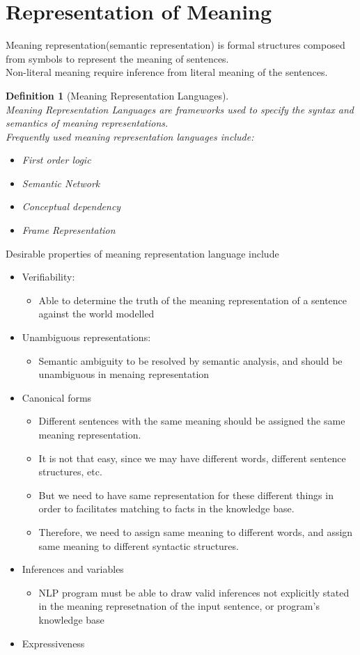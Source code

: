 \documentclass[12pt]{article}
\newtheorem{definition}{Definition}[section]
\theoremstyle{definition}
\begin{document}
\section{Representation of Meaning}
Meaning representation(semantic representation) is formal structures composed from symbols to represent the meaning of sentences.\\
Non-literal meaning require inference from literal meaning of the sentences.\\
\begin{definition}[Meaning Representation Languages]
\hfill\\\normalfont Meaning Representation Languages are frameworks used to specify the syntax and semantics of meaning representations. \\
Frequently used meaning representation languages include:
\begin{itemize}
	\item First order logic
	\item Semantic Network
	\item Conceptual dependency
	\item Frame Representation
\end{itemize}
\end{definition}
Desirable properties of meaning representation language include
\begin{itemize}
	\item Verifiability: 
	\begin{itemize}
		\item Able to determine the truth of the meaning representation of a sentence against the world modelled
	\end{itemize}
	\item Unambiguous representations:
	\begin{itemize}
		\item Semantic ambiguity to be resolved by semantic analysis, and should be unambiguous in menaing representation
	\end{itemize}
	\item Canonical forms
	\begin{itemize}
		\item Different sentences with the same meaning should be assigned the same meaning representation.
		\item It is not that easy, since we may have different words, different sentence structures, etc.
		\item But we need to have same representation for these different things in order to facilitates matching to facts in the knowledge base.
		\item Therefore, we need to assign same meaning to different words, and assign same meaning to different syntactic structures.
	\end{itemize}
	\item Inferences and variables
	\begin{itemize}
		\item NLP program must be able to draw valid inferences not explicitly stated in the meaning represetnation of the input sentence, or program's knowledge base
	\end{itemize}
	\item Expressiveness
\end{itemize}
\end{document}
